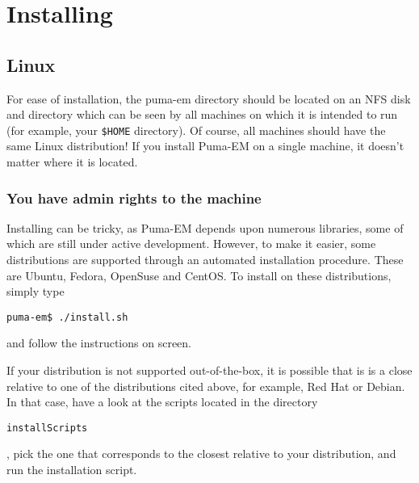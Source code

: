 \documentclass[a4paper,10pt]{book}
\begin{document}
\chapter{Installing}

\section{Linux}
%
\par
For ease of installation, the puma-em directory should be located on an NFS disk and directory which can be seen by all machines on which it is intended to run (for example, your \texttt{\$HOME} directory). Of course, all machines should have the same Linux distribution! If you install Puma-EM on a single machine, it doesn't matter where it is located.

\subsection{You have admin rights to the machine}
%
\par
Installing can be tricky, as Puma-EM depends upon numerous libraries, some of which are still under active development. However, to make it easier, some distributions are supported through an automated installation procedure. These are Ubuntu, Fedora, OpenSuse and CentOS. To install on these distributions, simply type 
\begin{verbatim}
puma-em$ ./install.sh
\end{verbatim}
and follow the instructions on screen.
%
\par
If your distribution is not supported out-of-the-box, it is possible that is is a close relative to one of the distributions cited above, for example, Red Hat or Debian. In that case, have a look at the scripts located in the directory \begin{verbatim}installScripts\end{verbatim}, pick the one that corresponds to the closest relative to your distribution, and run the installation script.
\end{document}
